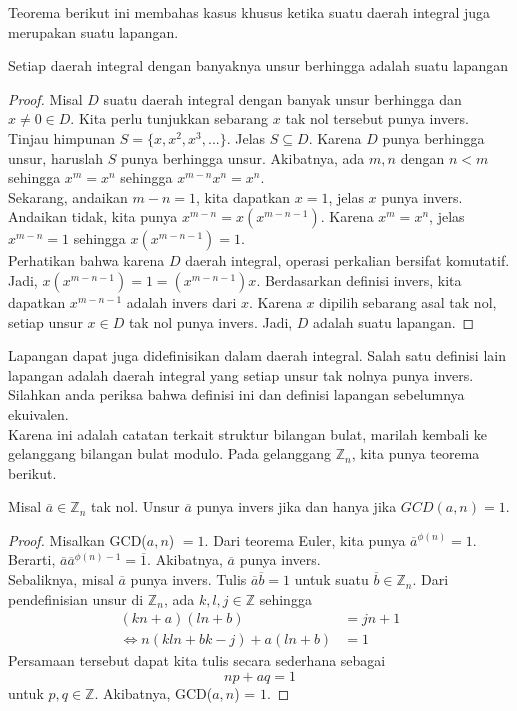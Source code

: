 	Teorema berikut ini membahas kasus khusus ketika suatu daerah integral juga merupakan suatu lapangan.
	\begin{theorem}
		Setiap daerah integral dengan banyaknya unsur berhingga adalah suatu lapangan
	\end{theorem}
	\begin{proof}
		Misal $D$ suatu daerah integral dengan banyak unsur berhingga dan $x \ne 0 \in D$. Kita perlu tunjukkan sebarang $x$ tak nol tersebut punya invers. Tinjau himpunan $S = \{x, x^2, x^3, ... \}$. Jelas $S \subseteq D$. Karena $D$ punya berhingga unsur, haruslah $S$ punya berhingga unsur. Akibatnya, ada $m,n$ dengan $n < m$ sehingga $x^{m} = x^{n}$ sehingga $x^{m-n}x^{n} = x^{n}$.\\
		
		Sekarang, andaikan $m - n = 1$, kita dapatkan $x = 1$, jelas $x$ punya invers. Andaikan tidak, kita punya $x^{m-n} = x(x^{m-n-1})$. Karena $x^m = x^n$, jelas $x^{m-n} = 1$ sehingga $x(x^{m-n-1}) = 1$.\\
		
		Perhatikan bahwa karena $D$ daerah integral, operasi perkalian bersifat komutatif. Jadi, $x(x^{m-n-1}) = 1 = (x^{m-n-1})x$. Berdasarkan definisi invers, kita dapatkan $x^{m-n-1}$ adalah invers dari $x$. Karena $x$ dipilih sebarang asal tak nol, setiap unsur $x \in D$ tak nol punya invers. Jadi, $D$ adalah suatu lapangan.
	\end{proof}
	Lapangan dapat juga didefinisikan dalam daerah integral. Salah satu definisi lain lapangan adalah daerah integral yang setiap unsur tak nolnya punya invers. Silahkan anda periksa bahwa definisi ini dan definisi lapangan sebelumnya ekuivalen.
	\\
	
	Karena ini adalah catatan terkait struktur bilangan bulat, marilah kembali ke gelanggang bilangan bulat modulo. Pada gelanggang $\mathbb{Z}_n$, kita punya teorema berikut.
	
	\begin{theorem}
		Misal $\overline{a} \in \mathbb{Z}_n$ tak nol. Unsur $\overline{a}$ punya invers jika dan hanya jika $GCD(a,n)=1$.
	\end{theorem}
	\begin{proof}
		Misalkan GCD($a,n$) $ = 1$. Dari teorema Euler, kita punya $\overline{a}^{\phi(n)} = 1$. Berarti, $\overline{a}\overline{a}^{\phi(n)-1} = \overline{1}$. Akibatnya, $\overline{a}$ punya invers.
		\\
		
		Sebaliknya, misal $\overline{a}$ punya invers. Tulis $\overline{a}\overline{b} = 1$ untuk suatu $\overline{b} \in \mathbb{Z}_n$. Dari pendefinisian unsur di $\mathbb{Z}_n$, ada $k,l,j \in \mathbb{Z}$ sehingga
		\begin{equation*}
		\begin{split}
		(kn+a)(ln+b) &= jn+1\\
		\iff n(kln + bk - j) + a(ln + b) &= 1
		\end{split}
		\end{equation*}
		Persamaan tersebut dapat kita tulis secara sederhana sebagai $$np + aq = 1$$
		untuk $p,q \in \mathbb{Z}$.
		Akibatnya, GCD($a,n$) = $1$.
	\end{proof}
